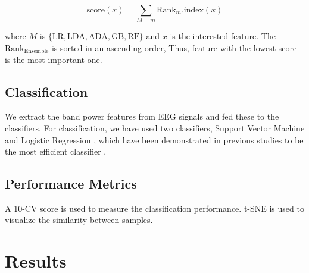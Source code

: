 \documentclass[pdflatex,sn-mathphys]{sn-jnl}%
\theoremstyle{thmstyleone}%
\theoremstyle{thmstyletwo}%
\theoremstyle{thmstylethree}%
\begin{document}
\begin{equation} \label{eq:rank_score}
   \text{score}(x) = \sum_{M=m} \text{Rank}_{m}.\text{index}(x)
\end{equation}

where $M$ is $\{\text{LR}, \text{LDA}, \text{ADA}, \text{GB}, \text{RF} \}$ and $x$ is the interested feature. The $\text{Rank}_{\text{Ensemble}}$ is sorted in an ascending order, Thus, feature with the lowest score is the most important one.

\subsection{Classification}\label{subsec4}
We extract the band power features from EEG signals and fed these to the classifiers. For classification, we have used two classifiers, Support Vector Machine \cite{Alshargie-2018, Subhani-2017} and Logistic Regression \cite{Saeed2020}, which have been demonstrated in previous studies to be the most efficient classifier \cite{Alshargie-2018, Kotsiantis2007, Saeed2020}.

\subsection{Performance Metrics}\label{subsec5}





A 10-CV score is used to measure the classification performance. t-SNE is used to visualize the similarity between samples. 

\section{Results}\label{sec4}
\end{document}

